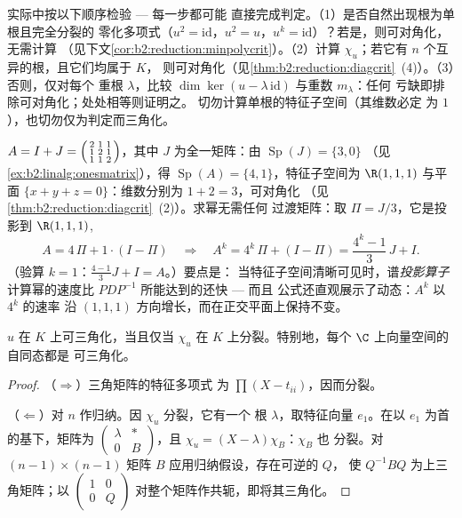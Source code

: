 \begin{method}[判定可对角化]\label{met:b2:reduction:decide}
实际中按以下顺序检验 --- 每一步都可能
直接完成判定。（1）是否自然出现根为单根且完全分裂的
零化多项式（$u^2 = \mathrm{id}$，$u^2 = u$，$u^k =
\mathrm{id}$）？若是，则可对角化，无需计算
（见下文\cref{cor:b2:reduction:minpolycrit}）。（2）计算
$\chi_u$；若它有 $n$ 个互异的根，且它们均属于 $K$，
则可对角化（见\cref{thm:b2:reduction:diagcrit}~(4)）。（3）否则，仅对每个
重根 $\lambda$，比较 $\dim\ker(u -
\lambda\,\mathrm{id})$ 与重数 $m_\lambda$：任何
亏缺即排除可对角化；处处相等则证明之。
切勿计算单根的特征子空间（其维数必定
为 $1$），也切勿仅为判定而三角化。
\end{method}

\begin{example}[对角化的应用]\label{ex:b2:reduction:diagwork}
$A = I + J = \begin{psmallmatrix}2 & 1 & 1\\ 1 & 2 & 1\\ 1 & 1 &
2\end{psmallmatrix}$，其中 $J$ 为全一矩阵：由
$\operatorname{Sp}(J) = \{3, 0\}$
（见\cref{ex:b2:linalg:onesmatrix}），得 $\operatorname{Sp}(A) = \{4,
1\}$，特征子空间为 $\R(1,1,1)$ 与平面 $\{x + y + z =
0\}$：维数分别为 $1 + 2 = 3$，可对角化
（见\cref{thm:b2:reduction:diagcrit}~(2)）。求幂无需任何
过渡矩阵：取 $\Pi = J/3$，它是投影到
$\R(1,1,1)$,
\[
A = 4\,\Pi + 1\cdot(I - \Pi)
\quad\Longrightarrow\quad
A^k = 4^k\,\Pi + (I - \Pi)
= \frac{4^k - 1}{3}\,J + I .
\]
（验算 $k = 1$：$\frac{4-1}3 J + I = A$。）要点是：
当特征子空间清晰可见时，谱\emph{投影算子}
计算幂的速度比 $PDP^{-1}$ 所能达到的还快 --- 而且
公式还直观展示了动态：$A^k$ 以 $4^k$ 的速率
沿 $(1,1,1)$ 方向增长，而在正交平面上保持不变。
\end{example}

\begin{theorem}[三角化]\label{thm:b2:reduction:trigonalization}
$u$ 在 $K$ 上可三角化，当且仅当 $\chi_u$ 在
$K$ 上分裂。特别地，每个 $\C$ 上向量空间的自同态都是
可三角化。
\end{theorem}

\begin{proof}
（$\Rightarrow$）三角矩阵的特征多项式
为 $\prod(X - t_{ii})$，因而分裂。

（$\Leftarrow$）对 $n$ 作归纳。因 $\chi_u$ 分裂，它有一个
根 $\lambda$，取特征向量 $e_1$。在以
$e_1$ 为首的基下，矩阵为 $\begin{pmatrix} \lambda & \ast\\ 0 &
B\end{pmatrix}$，且 $\chi_u = (X - \lambda)\chi_B$：$\chi_B$ 也
分裂。对 $(n-1) \times
(n-1)$ 矩阵 $B$ 应用归纳假设，存在可逆的 $Q$，
使 $Q^{-1}BQ$ 为上三角矩阵；以 $\begin{pmatrix}1 & 0\\
0 & Q\end{pmatrix}$ 对整个矩阵作共轭，即将其三角化。
\end{proof}

